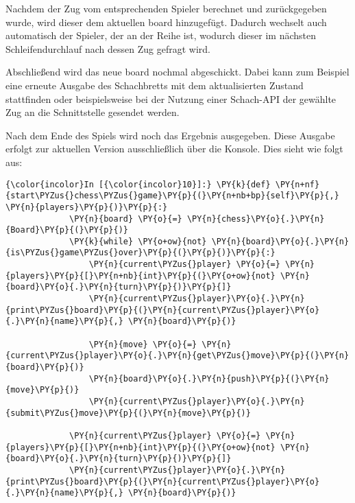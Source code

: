     Nachdem der Zug vom entsprechenden Spieler berechnet und zurückgegeben
wurde, wird dieser dem aktuellen board hinzugefügt. Dadurch wechselt
auch automatisch der Spieler, der an der Reihe ist, wodurch dieser im
nächsten Schleifendurchlauf nach dessen Zug gefragt wird.

Abschließend wird das neue board nochmal abgeschickt. Dabei kann zum
Beispiel eine erneute Ausgabe des Schachbretts mit dem aktualisierten
Zustand stattfinden oder beispielsweise bei der Nutzung einer Schach-API
der gewählte Zug an die Schnittstelle gesendet werden.

Nach dem Ende des Spiels wird noch das Ergebnis ausgegeben. Diese
Ausgabe erfolgt zur aktuellen Version ausschließlich über die Konsole.
Dies sieht wie folgt aus:

    \begin{Verbatim}[commandchars=\\\{\}]
{\color{incolor}In [{\color{incolor}10}]:} \PY{k}{def} \PY{n+nf}{start\PYZus{}chess\PYZus{}game}\PY{p}{(}\PY{n+nb+bp}{self}\PY{p}{,} \PY{n}{players}\PY{p}{)}\PY{p}{:}
             \PY{n}{board} \PY{o}{=} \PY{n}{chess}\PY{o}{.}\PY{n}{Board}\PY{p}{(}\PY{p}{)}
             \PY{k}{while} \PY{o+ow}{not} \PY{n}{board}\PY{o}{.}\PY{n}{is\PYZus{}game\PYZus{}over}\PY{p}{(}\PY{p}{)}\PY{p}{:}
                 \PY{n}{current\PYZus{}player} \PY{o}{=} \PY{n}{players}\PY{p}{[}\PY{n+nb}{int}\PY{p}{(}\PY{o+ow}{not} \PY{n}{board}\PY{o}{.}\PY{n}{turn}\PY{p}{)}\PY{p}{]}
                 \PY{n}{current\PYZus{}player}\PY{o}{.}\PY{n}{print\PYZus{}board}\PY{p}{(}\PY{n}{current\PYZus{}player}\PY{o}{.}\PY{n}{name}\PY{p}{,} \PY{n}{board}\PY{p}{)}
         
                 \PY{n}{move} \PY{o}{=} \PY{n}{current\PYZus{}player}\PY{o}{.}\PY{n}{get\PYZus{}move}\PY{p}{(}\PY{n}{board}\PY{p}{)}
                 \PY{n}{board}\PY{o}{.}\PY{n}{push}\PY{p}{(}\PY{n}{move}\PY{p}{)}
                 \PY{n}{current\PYZus{}player}\PY{o}{.}\PY{n}{submit\PYZus{}move}\PY{p}{(}\PY{n}{move}\PY{p}{)}
         
             \PY{n}{current\PYZus{}player} \PY{o}{=} \PY{n}{players}\PY{p}{[}\PY{n+nb}{int}\PY{p}{(}\PY{o+ow}{not} \PY{n}{board}\PY{o}{.}\PY{n}{turn}\PY{p}{)}\PY{p}{]}
             \PY{n}{current\PYZus{}player}\PY{o}{.}\PY{n}{print\PYZus{}board}\PY{p}{(}\PY{n}{current\PYZus{}player}\PY{o}{.}\PY{n}{name}\PY{p}{,} \PY{n}{board}\PY{p}{)}
         

\end{Verbatim}
